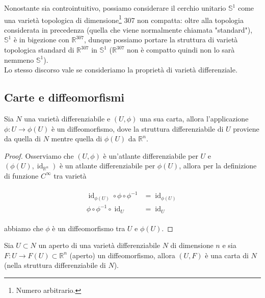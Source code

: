 Nonostante sia controintuitivo, possiamo considerare il cerchio unitario $ \mathbb{S}^{1} $ come una varietà topologica di dimensione\footnote{%
	Numero arbitrario.%
} 307 non compatta: oltre alla topologia considerata in precedenza (quella che viene normalmente chiamata "standard"), $ \mathbb{S}^{1} $ è in bigezione con $ \mathbb{R}^{307} $, dunque possiamo portare la struttura di varietà topologica standard di $ \mathbb{R}^{307} $ in $ \mathbb{S}^{1} $ ($ \mathbb{R}^{307} $ non è compatto quindi non lo sarà nemmeno $ \mathbb{S}^{1} $).\\
Lo stesso discorso vale se consideriamo la proprietà di varietà differenziale.

\subsection{Carte e diffeomorfismi}

\begin{definition}
	Sia $ N $ una varietà differenziabile e $ (U,\phi) $ una sua carta, allora l'applicazione $ \phi : U \to \phi(U) $ è un diffeomorfismo, dove la struttura differenziabile di $ U $ proviene da quella di $ N $ mentre quella di $ \phi(U) $ da $ \mathbb{R}^{n} $.
\end{definition}

\begin{proof}
	Osserviamo che $ (U,\phi) $ è un'atlante differenziabile per $ U $ e $ (\phi(U),\operatorname{id}_{\mathbb{R}^{n}}) $ è un atlante differenziabile per $ \phi(U) $, allora per la definizione di funzione $ C^{\infty} $ tra varietà
	
	\begin{align}
		\begin{split}
			\operatorname{id}_{\phi(U)} \circ \phi \circ \phi^{-1} &= \operatorname{id}_{\phi(U)}\\
			\phi \circ \phi^{-1} \circ \operatorname{id}_{U} &= \operatorname{id}_{U}
		\end{split}	
	\end{align}

	abbiamo che $ \phi $ è un diffeomorfismo tra $ U $ e $ \phi(U) $.
\end{proof}

\begin{definition}
	Sia $ U \subset N $ un aperto di una varietà differenziabile $ N $ di dimensione $ n $ e sia $ F : U \to F(U) \subset \mathbb{R}^{n} $ (aperto) un diffeomorfismo, allora $ (U,F) $ è una carta di $ N $ (nella struttura differenziabile di $ N $).
\end{definition}

